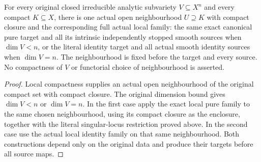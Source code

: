 \begin{corollary}
\label{hir:original-local-all-dimension-irreducible-family}
\leanok
For every original closed irreducible analytic subvariety $V\subseteq X^n$
and every compact $K\subseteq X$, there is one actual open neighbourhood
$U\supseteq K$ with compact closure and the corresponding full actual
local family: the same exact canonical pure target and all its intrinsic
independently stopped smooth sources when $\dim V<n$, or the literal
identity target and all actual smooth identity sources when $\dim V=n$.
The neighbourhood is fixed before the target and every source. No
compactness of $V$ or functorial choice of neighbourhood is asserted.
\end{corollary}
\begin{proof}
Local compactness supplies an actual open neighbourhood of the original
compact set with compact closure. The original dimension bound gives
$\dim V<n$ or $\dim V=n$. In the first case apply the exact local pure
family to the same chosen neighbourhood, using its compact closure as
the enclosure, together with the literal singular-locus restriction
proved above. In the second case use the actual local identity family
on that same neighbourhood. Both constructions depend only on the
original data and produce their targets before all source maps.
\end{proof}

